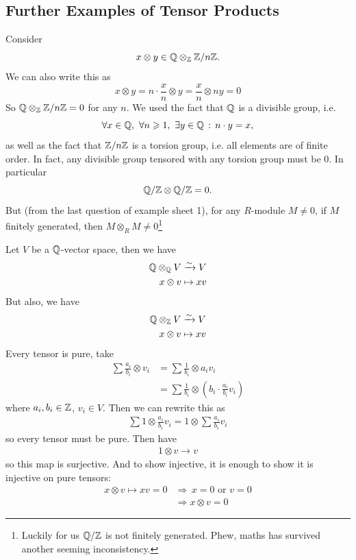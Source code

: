 \documentclass{article}
\begin{document}
\subsection{Further Examples of Tensor Products}\newlec
\begin{ex} Consider \[ x \otimes y \in \mathbb{Q} \otimes_{\mathbb{Z}} \mathbb{Z} / n \mathbb{Z}.\] We can also write this as \[ x \otimes y = n \cdot \frac{x}{n} \otimes y = \frac{x}{n} \otimes ny = 0\]
So $\mathbb{Q} \otimes_{\mathbb{Z}} \mathbb{Z}/n\mathbb{Z} = 0$ for any $n$. We used the fact that $\mathbb{Q}$ is a divisible group, i.e. \[ \forall x \in \mathbb{Q}, \, \, \forall n \geqslant 1, \,\, \exists y \in \mathbb{Q} \, : \, n \cdot y = x,\] as well as the fact that $\mathbb{Z}/n\mathbb{Z}$ is a torsion group, i.e. all elements are of finite order. In fact, any divisible group tensored with any torsion group must be $0$. In particular \[ \mathbb{Q}/\mathbb{Z} \otimes \mathbb{Q}/ \mathbb{Z} = 0.\] But (from the last question of example sheet 1), for any $R$-module $M\neq 0$, if $M$ finitely generated, then $M \otimes_{R} M \neq 0$\footnote{Luckily for us $\mathbb{Q}/\mathbb{Z}$ is not finitely generated. Phew, maths has survived another seeming inconsistency.}
\end{ex}
\begin{ex}
    Let $V$ be a $\mathbb{Q}$-vector space, then we have 
    \begin{align*}
         \mathbb{Q} \otimes_{\mathbb{Q}} V &\xrightarrow{\sim} V\\
         x \otimes v &\mapsto xv
    \end{align*}
    But also, we have 
    \begin{align*}
        \mathbb{Q} \otimes_{\mathbb{Z}} V &\xrightarrow{\sim} V\\
         x \otimes v &\mapsto xv
    \end{align*}
    \proof Every tensor is pure, take 
    \begin{align*} 
        \sum \frac{a_i}{b_i} \otimes v_i &= \sum \frac{1}{b_i} \otimes a_i v_i\\
        &= \sum \frac{1}{b_{i}} \otimes (b_{i} \cdot \frac{a_{i}}{b_i}v_i)
    \end{align*}
    where $a_i,b_i \in \mathbb{Z}$, $v_i \in V$. Then we can rewrite this as 
    \begin{align*}
        \sum 1 \otimes \frac{a_i}{b_i}v_i = 1 \otimes \sum \frac{a_i}{b_i}v_i
    \end{align*}
    so every tensor must be pure. Then have
    \begin{align*}
        1 \otimes v \to v
    \end{align*}
    so this map is surjective. And to show injective, it is enough to show it is injective on pure tensors:
    \begin{align*}
        x \otimes v \mapsto xv = 0 &\Rightarrow \, x=0 \text{ or } v=0\\
        &\Rightarrow x \otimes v =0
    \end{align*}
\end{ex}
\end{document}
